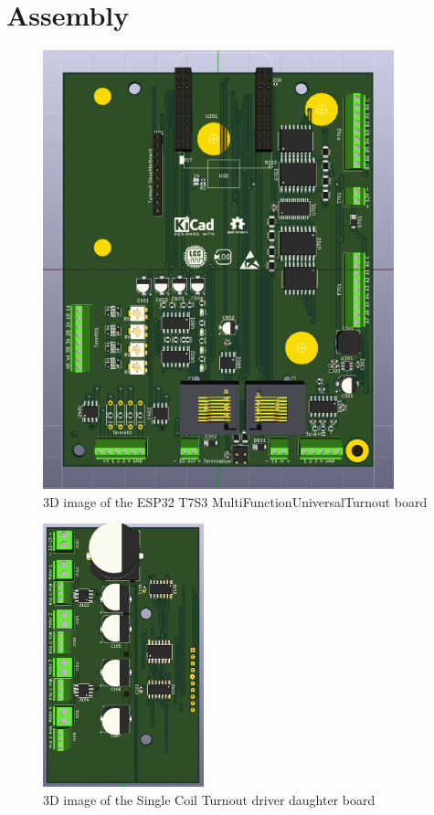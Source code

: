 \section{Assembly}
\begin{figure}[hbpt]\begin{centering}%
\includegraphics[width=4in]{ESP32-T7S3-MultiFunctionUniversalTurnout.png}
\caption{3D image of the ESP32 T7S3 MultiFunctionUniversalTurnout board}
\end{centering}\end{figure}
\begin{figure}[hbpt]\begin{centering}%
\includegraphics[height=3in]{SC-DaughterBoard.png}
\caption{3D image of the Single Coil Turnout driver daughter board}
\end{centering}\end{figure}
